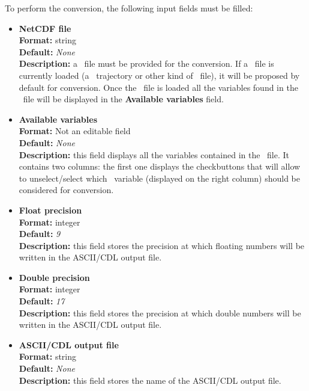 \documentclass[a4paper,11pt]{report}
\begin{document}
To perform the conversion, the following input fields must be filled:
\begin{itemize}
\item \textbf{NetCDF file}\\
\textbf{Format:} string\\
\textbf{Default:} \textit{None}\\
\textbf{Description:} a \NetCDF\ file must be provided for the conversion. If a \NetCDF\ file is currently loaded (a \MMTK\ 
trajectory or other kind of \NetCDF\ file), it will be proposed by default for conversion. Once the \NetCDF\ file is loaded 
all the variables found in the \NetCDF\ file will be displayed in the \textbf{Available variables} field.

\item \textbf{Available variables}\\
\textbf{Format:} Not an editable field\\
\textbf{Default:} \textit{None}\\
\textbf{Description:} this field displays all the variables contained in the \NetCDF\ file. It contains two columns: 
the first one displays the checkbuttons that will allow to unselect/select which \NetCDF\ variable (displayed on the right column) 
should be considered for conversion.

\item \textbf{Float precision}\\
\textbf{Format:} integer\\
\textbf{Default:} \textit{9}\\
\textbf{Description:} this field stores the precision at which floating numbers will be written in the ASCII/CDL output file.

\item \textbf{Double precision}\\
\textbf{Format:} integer\\
\textbf{Default:} \textit{17}\\
\textbf{Description:} this field stores the precision at which double numbers will be written in the ASCII/CDL output file.

\item \textbf{ASCII/CDL output file}\\
\textbf{Format:} string\\
\textbf{Default:} \textit{None}\\
\textbf{Description:} this field stores the name of the ASCII/CDL output file.\\
\end{itemize}
\end{document}
